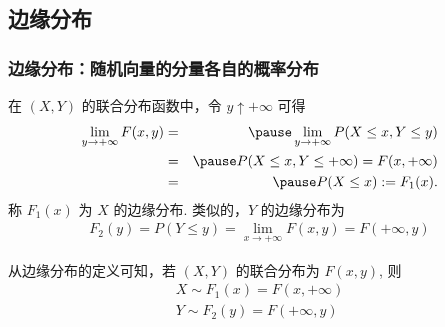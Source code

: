 \documentclass[Prob-All.tex]{subfiles}
\begin{document}
\subsection{边缘分布}
\begin{frame}
  \frametitle{边缘分布：随机向量的分量各自的概率分布}
  \begin{defi}[边缘分布] 在 $(X,Y)$ 的联合分布函数中，令 $y\uparrow +\infty$ 可得
    \begin{eqnarray*}
      \lim_{y\rightarrow+\infty}F(x,y)&=&\pause \lim_{y\rightarrow+\infty}P(X\le x, Y\le y)\\ &=& \pause P(X\le x,Y\le +\infty)=F(x,+\infty)
      \\
      &=&\pause P(X\le x):=F_1(x).    \end{eqnarray*}
  称 $F_1 (x)$ 为 $X$ 的边缘分布. \pause 类似的，$Y$ 的边缘分布为
\begin{eqnarray*}
F_2(y)=P(Y\le y)=\lim_{x\rightarrow+\infty}F(x,y)=F(+\infty,y)
\end{eqnarray*}

\end{defi}

\pause 从边缘分布的定义可知，若 $(X,Y)$ 的联合分布为 $F (x,y)$, 则
\begin{eqnarray*}
X\sim F_1(x)=F(x,+\infty)\\
Y\sim F_2(y)=F(+\infty, y)
\end{eqnarray*}
\end{frame}
\end{document}
